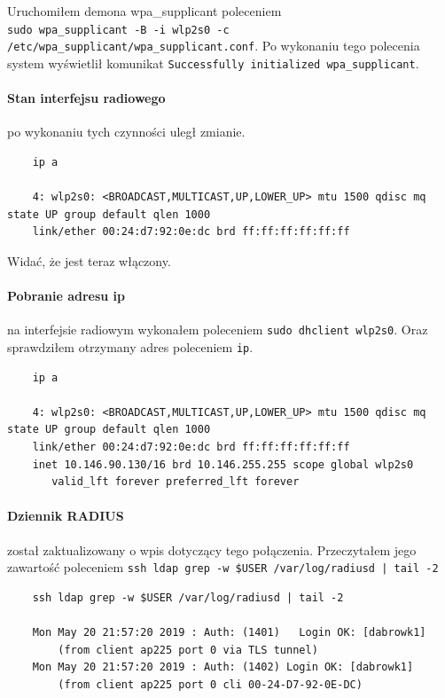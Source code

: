 \documentclass{mwart} %
\begin{document}
\vspace{5 mm}
Uruchomiłem demona wpa\_supplicant poleceniem \\\texttt{sudo wpa\_supplicant -B -i wlp2s0 -c /etc/wpa\_supplicant/wpa\_supplicant.conf}.
Po wykonaniu tego polecenia system wyświetlił komunikat \texttt{Successfully initialized wpa\_supplicant}.

\paragraph{Stan interfejsu radiowego} po wykonaniu tych czynności uległ zmianie.
\begin{verbatim}
    ip a

    4: wlp2s0: <BROADCAST,MULTICAST,UP,LOWER_UP> mtu 1500 qdisc mq state UP group default qlen 1000
    link/ether 00:24:d7:92:0e:dc brd ff:ff:ff:ff:ff:ff
\end{verbatim}
Widać, że jest teraz włączony.

\paragraph{Pobranie adresu ip} na interfejsie radiowym wykonałem poleceniem \texttt{sudo dhclient wlp2s0}. Oraz sprawdziłem otrzymany adres poleceniem \texttt{ip}.
\begin{verbatim}
    ip a

    4: wlp2s0: <BROADCAST,MULTICAST,UP,LOWER_UP> mtu 1500 qdisc mq state UP group default qlen 1000
    link/ether 00:24:d7:92:0e:dc brd ff:ff:ff:ff:ff:ff
    inet 10.146.90.130/16 brd 10.146.255.255 scope global wlp2s0
       valid_lft forever preferred_lft forever
\end{verbatim}

\paragraph{Dziennik RADIUS} został zaktualizowany o wpis dotyczący tego połączenia.
Przeczytałem jego zawartość poleceniem \texttt{ssh ldap grep -w \$USER /var/log/radiusd | tail -2}
\begin{verbatim}
    ssh ldap grep -w $USER /var/log/radiusd | tail -2

    Mon May 20 21:57:20 2019 : Auth: (1401)   Login OK: [dabrowk1] 
        (from client ap225 port 0 via TLS tunnel) 
    Mon May 20 21:57:20 2019 : Auth: (1402) Login OK: [dabrowk1] 
        (from client ap225 port 0 cli 00-24-D7-92-0E-DC)
\end{verbatim}
\end{document}

